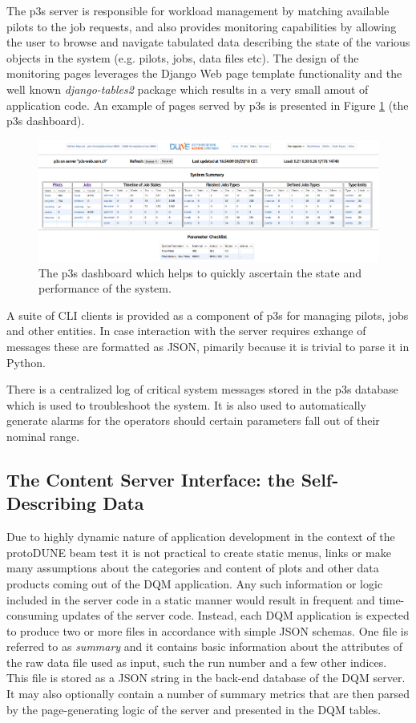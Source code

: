 \documentclass{webofc}
\newcommand{\pd}{protoDUNE\xspace}
\begin{document}
The p3s server is responsible for workload management by matching available pilots to the job requests,
and also provides monitoring capabilities by allowing the user to browse and navigate
tabulated data describing the state of the various objects in the system (e.g. pilots, jobs, data files etc).
The design of the monitoring pages leverages the Django Web page template functionality and
the well known \textit{django-tables2} package which results
in a very small amout of application code. An example of pages served by p3s is
presented in Figure \ref{fig:p3s_dash} (the p3s dashboard).

\begin{figure}[tb]
\centering\includegraphics[width=1.0\textwidth]{figures/p3s_dash_2018_v1.png}
\caption{\label{fig:p3s_dash}The p3s dashboard which helps to quickly ascertain
the state and performance of the system.}
\end{figure}

 A suite of CLI clients is provided as a component of p3s for managing pilots, jobs and
other entities. In case interaction with the server requires exhange of messages these are
formatted as JSON, pimarily because it is trivial to parse it in Python.

There is a centralized log of critical system messages stored in the p3s database which
is used to troubleshoot the system. It is also used to automatically generate alarms
for the operators should certain parameters fall out of their nominal range.

\subsection{The Content Server Interface: the Self-Describing Data}
Due to highly dynamic nature of application development in the context of the \pd beam
test it is not practical to create static menus, links or make many assumptions about
the categories and content of plots and other data products coming out of the DQM
application. Any such information or logic included in the server code in a static manner
would result in frequent and time-consuming updates of the server code. Instead,
each DQM application is expected to produce two or more files in accordance
with simple JSON schemas. One file is referred to as \textit{summary} and it contains basic
information about the attributes of the raw data file used as input, such the run number
and a few other indices. This file is stored as a JSON string in the back-end database
of the DQM server. It may also optionally contain a number of summary metrics
that are then parsed by the page-generating logic of the server and presented
in the DQM tables.
\end{document}
